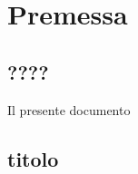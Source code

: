 
\chapter{Premessa}
\label{chp:premessa}

\section{????}
\label{sec:?}

Il presente documento 


\section{titolo}
\label{sec:nota-import}

\lipsum[20-23]